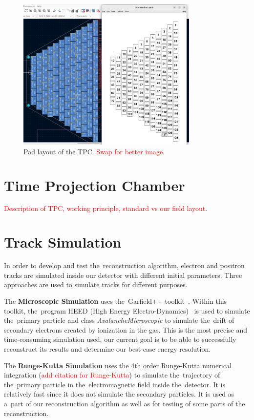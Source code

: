 \documentclass[]{article}
\begin{document}
	\begin{figure}
		\centering
		\includegraphics[width=0.8\textwidth]{padlayout.png}
		\caption{Pad layout of the TPC. \textcolor{red}{Swap for better image.}}
		\label{fig:padlayout}
	\end{figure}
	
	\section{Time Projection Chamber}
	\label{sec:tpc}
	\textcolor{red}{Description of TPC, working principle, standard vs our field layout.}
	
	\section{Track Simulation}
	In order to develop and test the~reconstruction algorithm, electron and positron tracks are simulated inside our detector with different initial parameters. Three approaches are used to simulate tracks for different purposes.
	
	The \textbf{Microscopic Simulation} uses the~Garfield++ toolkit~\cite{Garfield++}. Within this toolkit, the~program HEED (High Energy Electro-Dynamics)~\cite{HEED} is used to simulate the~primary particle and class \textit{AvalancheMicroscopic} to simulate the~drift of secondary electrons created by ionization in the gas. This is the most precise and time-consuming simulation used, our current goal is to be able to successfully reconstruct its results and determine our best-case energy resolution.
	
	The \textbf{Runge-Kutta Simulation} uses the 4th order Runge-Kutta numerical integration (\textcolor{red}{add citation for Runge-Kutta}) to simulate the~trajectory of the~primary particle in the~electromagnetic field inside the~detector. It is relatively fast since it does not simulate the secondary particles. It is used as a~part of our reconstruction algorithm as well as for testing of some parts of the reconstruction.
	
\end{document}
